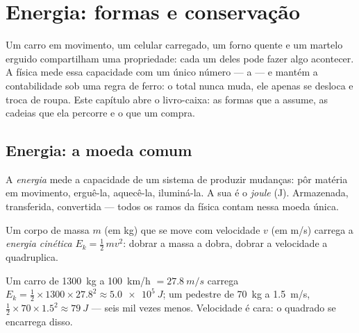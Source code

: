 \chapter{Energia: formas e conservação}\label{ch:g10:energy-conservation}

Um carro em movimento, um celular carregado, um forno quente e um martelo
erguido compartilham uma propriedade: cada um deles pode fazer algo
acontecer. A física mede essa capacidade com um único número --- a
 --- e mantém a contabilidade sob uma regra de ferro: o total
nunca muda, ele apenas se desloca e troca de roupa. Este capítulo abre o
livro-caixa: as formas que a  assume, as cadeias que ela percorre
e o que um  compra.

\section{Energia: a moeda comum}

\begin{definition}\label{def:g10:energy-conservation:energy}
A \emph{energia} mede a capacidade de um sistema de
produzir mudanças: pôr matéria em movimento, erguê-la, aquecê-la,
iluminá-la. A sua  é o \emph{joule} (\unit{J}).
Armazenada, transferida, convertida --- todos os ramos da física contam
nessa moeda única.
\end{definition}

\begin{definition}\label{def:g10:energy-conservation:kinetic}
Um corpo de massa $m$ (em \unit{kg}) que se move com velocidade $v$ (em
\unit{m/s}) carrega a \emph{energia cinética}
$E_k = \tfrac12\, m v^2$: dobrar a massa a dobra, dobrar a velocidade a
quadruplica.
\end{definition}

\begin{example}\label{ex:g10:energy-conservation:kinetic}
Um carro de \qty{1300}{kg} a \qty{100}{km/h} $= \qty{27.8}{m/s}$ carrega
$E_k = \tfrac12 \times 1300 \times 27.8^2 \approx \qty{5.0e5}{J}$; um
pedestre de \qty{70}{kg} a \qty{1.5}{m/s},
$\tfrac12 \times 70 \times 1.5^2 \approx \qty{79}{J}$ --- seis mil vezes
menos. Velocidade é cara: o quadrado se encarrega disso.
\end{example}

